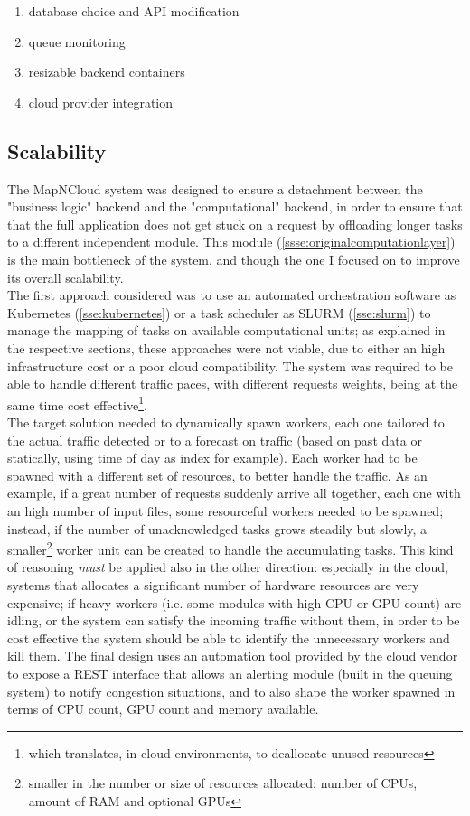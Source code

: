 \begin{enumerate}
	\item database choice and API modification
	\item queue monitoring
	\item resizable backend containers
	\item cloud provider integration
\end{enumerate}

\subsection{Scalability}
  The MapNCloud system was designed to ensure a detachment between the "business logic" backend and the "computational" backend, in order to ensure that that the full application does not get stuck on a request by offloading longer tasks to a different independent module. This module (\ref{ssse:originalcomputationlayer}) is the main bottleneck of the system, and though the one I focused on to improve its overall scalability.\\
  The first approach considered was to use an automated orchestration software as Kubernetes (\ref{sse:kubernetes}) or a task scheduler as SLURM (\ref{sse:slurm}) to manage the mapping of tasks on available computational units; as explained in the respective sections, these approaches were not viable, due to either an high infrastructure cost or a poor cloud compatibility. The system was required to be able to handle different traffic paces, with different requests weights, being at the same time cost effective\footnote{which translates, in cloud environments, to deallocate unused resources}.\\
  The target solution needed to dynamically spawn workers, each one tailored to the actual traffic detected or to a forecast on traffic (based on past data or statically, using time of day as index for example). Each worker had to be spawned with a different set of resources, to better handle the traffic. As an example, if a great number of requests suddenly arrive all together, each one with an high number of input files, some resourceful workers needed to be spawned; instead, if the number of unacknowledged tasks grows steadily but slowly, a smaller\footnote{smaller in the number or size of resources allocated: number of CPUs, amount of RAM and optional GPUs} worker unit can be created to handle the accumulating tasks. This kind of reasoning \textit{must} be applied also in the other direction: especially in the cloud, systems that allocates a significant number of hardware resources are very expensive; if heavy workers (i.e. some modules with high CPU or GPU count) are idling, or the system can satisfy the incoming traffic without them, in order to be cost effective the system should be able to identify the unnecessary workers and kill them. The final design uses an automation tool provided by the cloud vendor to expose a REST interface that allows an alerting module (built in the queuing system) to notify congestion situations, and to also shape the worker spawned in terms of CPU count, GPU count and memory available.

